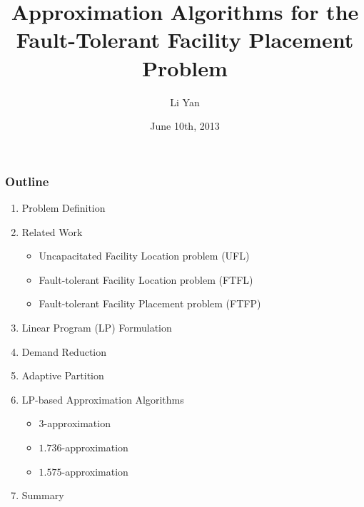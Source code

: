 \documentclass[handout, hyperref, dvipsnames]{beamer}
\title[FTFP]{Approximation Algorithms
  for the Fault-Tolerant Facility Placement Problem}
\author[lyan]{Li Yan}
\date{June 10th, 2013}
\institute[UCR]{
  Computer Science\\
  University of California Riverside\\
}
\date{}
\begin{document}
\begin{frame}
  \titlepage
\end{frame}

\begin{frame}
  \frametitle{Outline}
  \begin{enumerate}

  \item Problem Definition

  \item Related Work
    \begin{itemize}
    \item Uncapacitated Facility Location problem (UFL)
    \item Fault-tolerant Facility Location problem (FTFL)
    \item Fault-tolerant Facility Placement problem (FTFP)
    \end{itemize}

  \item Linear Program (LP) Formulation

  \item Demand Reduction

  \item Adaptive Partition

  \item LP-based Approximation Algorithms
      \begin{itemize}
        \item $3$-approximation
        \item $1.736$-approximation
        \item $1.575$-approximation
        \end{itemize}

  \item{Summary}
  \end{enumerate}
\end{frame}
\end{document}
